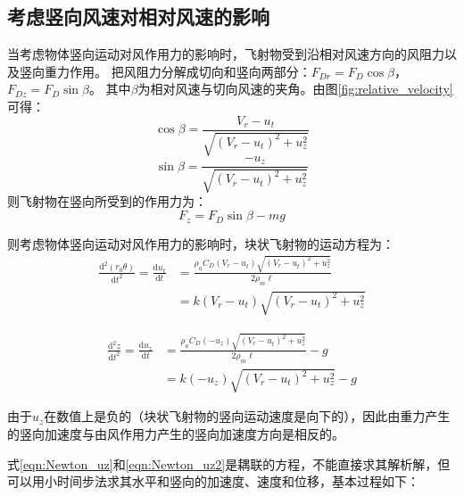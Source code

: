 \documentclass{ctexart}
\begin{document}
\subsection{考虑竖向风速对相对风速的影响}
当考虑物体竖向运动对风作用力的影响时，飞射物受到沿相对风速方向的风阻力以及竖向重力作用。
把风阻力分解成切向和竖向两部分：$F_{Dr} = F_D \cos \beta$， $F_{Dz} = F_D \sin \beta$。
其中$\beta$为相对风速与切向风速的夹角。由图\ref{fig:relative_velocity}可得：
\begin{equation}
\cos \beta=\frac{V_r-u_t}{\sqrt{(V_r-u_t)^2+u_z^2}}
\end{equation}
\begin{equation}
\sin \beta=\frac{-u_z}{\sqrt{(V_r-u_t)^2+u_z^2}}
\end{equation}
则飞射物在竖向所受到的作用力为：
\begin{equation}
F_z = F_D \sin \beta - mg
\end{equation}

则考虑物体竖向运动对风作用力的影响时，块状飞射物的运动方程为\cite{Holmes2004}：
\begin{equation}
\label{eqn:Newton_uz}
\begin{split}
\frac{\mathrm{d}^2 (r_0 \theta)}{\mathrm{d} t^2} = \frac{\mathrm{d} u_t}{\mathrm{d} t}& = \frac{\rho_a C_D (V_r - u_t)\sqrt{\left(V_r-u_t\right)^2+u_z^2}}{2\rho_m \ell} \\
 & = k\left(V_r-u_t\right)\sqrt{\left(V_r-u_t\right)^2+u_z^2}
\end{split}
\end{equation}

\begin{equation}
\label{eqn:Newton_uz2}
\begin{split}
  \frac{\mathrm{d}^2 z}{\mathrm{d} t^2} = \frac{\mathrm{d}u_z}{\mathrm{d} t}&=  \frac{\rho_a C_D ( - u_z)\sqrt{\left(V_r-u_t\right)^2+u_z^2}}{2\rho_m \ell} -g \\
   & = k\left(-u_z\right)\sqrt{\left(V_r-u_t\right)^2+u_z^2}-g
\end{split}
\end{equation}

由于$u_z$在数值上是负的（块状飞射物的竖向运动速度是向下的），因此由重力产生的竖向加速度与由风作用力产生的竖向加速度方向是相反的。

式\eqref{eqn:Newton_uz}和\eqref{eqn:Newton_uz2}是耦联的方程，不能直接求其解析解，但可以用小时间步法\cite{Baker2004}\cite{Zhu2008}求其水平和竖向的加速度、速度和位移，基本过程如下：
\end{document}
